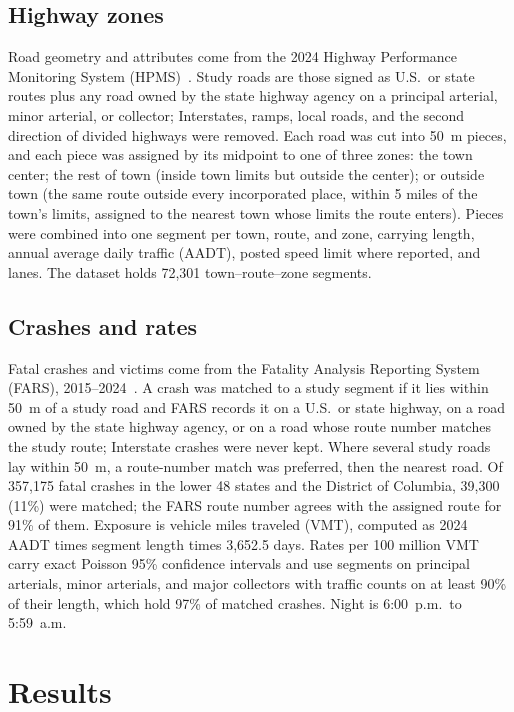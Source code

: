 \documentclass[11pt,letterpaper]{article}
\begin{document}
\subsection{Highway zones}
Road geometry and attributes come from the 2024 Highway Performance Monitoring System (HPMS)~\cite{hpms}. Study roads are those signed as U.S.\ or state routes plus any road owned by the state highway agency on a principal arterial, minor arterial, or collector; Interstates, ramps, local roads, and the second direction of divided highways were removed. Each road was cut into 50~m pieces, and each piece was assigned by its midpoint to one of three zones: the town center; the rest of town (inside town limits but outside the center); or outside town (the same route outside every incorporated place, within 5 miles of the town's limits, assigned to the nearest town whose limits the route enters). Pieces were combined into one segment per town, route, and zone, carrying length, annual average daily traffic (AADT), posted speed limit where reported, and lanes. The dataset holds 72{,}301 town--route--zone segments.

\subsection{Crashes and rates}
Fatal crashes and victims come from the Fatality Analysis Reporting System (FARS), 2015--2024~\cite{fars}. A crash was matched to a study segment if it lies within 50~m of a study road and FARS records it on a U.S.\ or state highway, on a road owned by the state highway agency, or on a road whose route number matches the study route; Interstate crashes were never kept. Where several study roads lay within 50~m, a route-number match was preferred, then the nearest road. Of 357{,}175 fatal crashes in the lower 48 states and the District of Columbia, 39{,}300 (11\%) were matched; the FARS route number agrees with the assigned route for 91\% of them. Exposure is vehicle miles traveled (VMT), computed as 2024 AADT times segment length times 3{,}652.5 days. Rates per 100 million VMT carry exact Poisson 95\% confidence intervals and use segments on principal arterials, minor arterials, and major collectors with traffic counts on at least 90\% of their length, which hold 97\% of matched crashes. Night is 6:00~p.m.\ to 5:59~a.m.

\section{Results}
\end{document}
